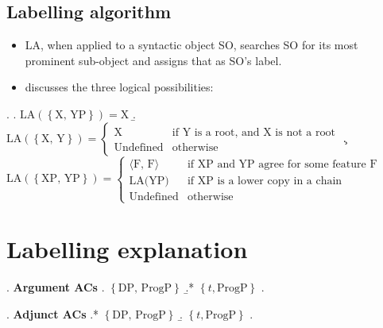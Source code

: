 \documentclass[letterpaper]{article}
\begin{document}
\subsection{Labelling algorithm}
\begin{itemize}
  \item LA, when applied to a syntactic object SO, searches SO for its most prominent sub-object and assigns that as SO's label.
  \item \textcite{chomsky2013problems,chomsky2013problems} discusses the three logical possibilities:
\end{itemize}
\ex.
\a. $\text{LA}(\left\{ \text{X, YP} \right\}) = \text{X}$
\b. $\text{LA}(\left\{ \text{X, Y} \right\}) = 
	\begin{cases}
	  \text{X} & \text{if Y is a root, and X is not a root}\\
	  \text{Undefined} & \text{otherwise}
	\end{cases}
	$
\c. $\text{LA}(\left\{ \text{XP, YP} \right\}) = 
	\begin{cases}
	  \langle\text{F, F}\rangle & \text{if XP and YP agree for some feature F}\\
	  \text{LA(YP)} & \text{if XP is a lower copy in a chain}\\
	  \text{Undefined} & \text{otherwise}
	\end{cases}
	$

\section{Labelling explanation}\label{sec:explanation}
\begin{minipage}[t]{0.35\textwidth}
  \ex. \textbf{Argument ACs}
  \a. $\left\{ \text{DP, ProgP} \right\}$
  \b.* $\left\{ t, \text{ProgP} \right\}$
  \z.

\end{minipage}
\begin{minipage}[t]{0.35\textwidth}
  \ex. \textbf{Adjunct ACs}
  \a.* $\left\{ \text{DP, ProgP} \right\}$
  \b. $\left\{ t, \text{ProgP} \right\}$
  \z.

\end{minipage}
\end{document}
